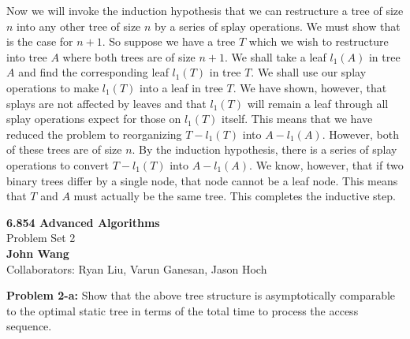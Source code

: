 \documentclass[psamsfonts]{amsart}
\newenvironment{sol}{\vspace{0.25cm}{\large \bfseries Solution:}}{\qedsymbol}
\newenvironment{prob}[1]{\begin{framed}{\large \bfseries Problem #1:}}{\end{framed}}
\newcommand{\makenewtitle}{
\begin{center}
{\huge \bfseries 6.854 Advanced Algorithms} \\
Problem Set 2\\
\vspace{0.25cm}
{\bfseries John Wang} \\
Collaborators: Ryan Liu, Varun Ganesan, Jason Hoch
\end{center}
\vspace{0.5cm}
}
\begin{document}
\begin{sol}
Now we will invoke the induction hypothesis that we can restructure a tree of size $n$ into any other tree of size $n$ by a series of splay operations. We must show that is the case for $n+1$. So suppose we have a tree $T$ which we wish to restructure into tree $A$ where both trees are of size $n+1$. We shall take a leaf $l_1(A)$ in tree $A$ and find the corresponding leaf $l_1(T)$ in tree $T$. We shall use our splay operations to make $l_1(T)$ into a leaf in tree $T$. We have shown, however, that splays are not affected by leaves and that $l_1(T)$ will remain a leaf through all splay operations expect for those on $l_1(T)$ itself. This means that we have reduced the problem to reorganizing $T - l_1(T)$ into $A - l_1(A)$. However, both of these trees are of size $n$. By the induction hypothesis, there is a series of splay operations to convert $T - l_1(T)$ into $A - l_1(A)$. We know, however, that if two binary trees differ by a single node, that node cannot be a leaf node. This means that $T$ and $A$ must actually be the same tree. This completes the inductive step. 
\end{sol}

\newpage

\makenewtitle

\begin{prob}{2-a}
Show that the above tree structure is asymptotically comparable to the optimal static tree in terms of the total time to process the access sequence.
\end{prob}
\end{document}
